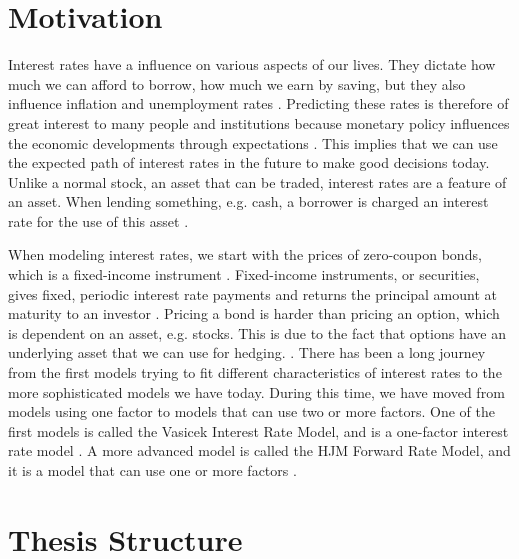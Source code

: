 
\section{Motivation}

\noindent Interest rates have a influence on various aspects of our lives. They dictate how much we can afford to borrow, how much we earn by saving, but they also influence inflation and unemployment rates \cite{investopedia_interest_rate_new}. Predicting these rates is therefore of great interest to many people and institutions because monetary policy influences the economic developments through expectations \cite{norges_bank_projections}. This implies that we can use the expected path of interest rates in the future to make good decisions today. Unlike a normal stock, an asset that can be traded, interest rates are a feature of an asset. When lending something, e.g. cash, a borrower is charged an interest rate for the use of this asset \cite{investopedia_interest_rate_new}.

When modeling interest rates, we start with the prices of zero-coupon bonds, which is a fixed-income instrument \cite[p.~510--511]{WFI}. Fixed-income instruments, or securities, gives fixed, periodic interest rate payments and returns the principal amount at maturity to an investor \cite{investopedia_fixed_income}. Pricing a bond is harder than pricing an option, which is dependent on an asset, e.g. stocks. This is due to the fact that options have an underlying asset that we can use for hedging. \cite[p.~511]{WFI}. There has been a long journey from the first models trying to fit different characteristics of interest rates to the more sophisticated models we have today. During this time, we have moved from models using one factor to models that can use two or more factors. One of the first models is called the Vasicek Interest Rate Model, and is a one-factor interest rate model \cite{investopedia_vasicek}. A more advanced model is called the HJM Forward Rate Model, and it is a model that can use one or more factors \cite[p.~507--624]{WFI}.

\newpage

\section{Thesis Structure}

